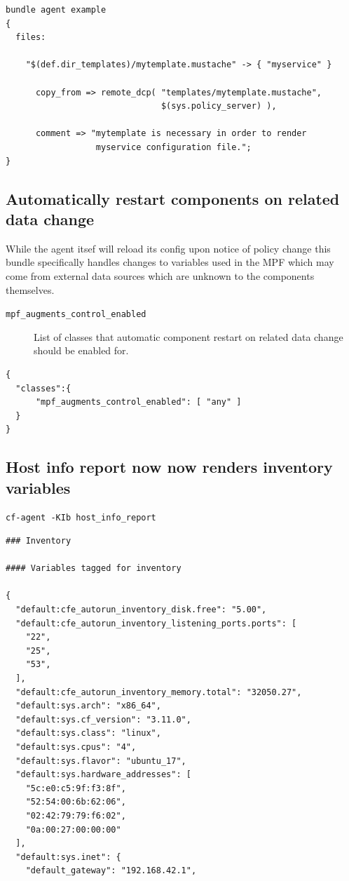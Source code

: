 \documentclass[11pt]{article}
\begin{document}
\begin{verbatim}
bundle agent example
{
  files:

    "$(def.dir_templates)/mytemplate.mustache" -> { "myservice" }

      copy_from => remote_dcp( "templates/mytemplate.mustache",
                               $(sys.policy_server) ),

      comment => "mytemplate is necessary in order to render
                  myservice configuration file.";
}
\end{verbatim}

\subsection*{Automatically restart components on related data change}
\label{sec:org56b9bf1}

\begin{NOTES}
While the agent itsef will reload its config upon notice of policy change this
bundle specifically handles changes to variables used in the MPF which may come
from external data sources which are unknown to the components themselves.
\end{NOTES}

\begin{description}
\item[{\texttt{mpf\_augments\_control\_enabled}}] List of classes that automatic component
restart on related data change should be enabled for.
\end{description}

\begin{verbatim}
{
  "classes":{
      "mpf_augments_control_enabled": [ "any" ]
  }
}
\end{verbatim}

\subsection*{Host info report now now renders inventory variables}
\label{sec:org011b701}

\begin{verbatim}
cf-agent -KIb host_info_report
\end{verbatim}

\begin{verbatim}
### Inventory

#### Variables tagged for inventory

{
  "default:cfe_autorun_inventory_disk.free": "5.00",
  "default:cfe_autorun_inventory_listening_ports.ports": [
    "22",
    "25",
    "53",
  ],
  "default:cfe_autorun_inventory_memory.total": "32050.27",
  "default:sys.arch": "x86_64",
  "default:sys.cf_version": "3.11.0",
  "default:sys.class": "linux",
  "default:sys.cpus": "4",
  "default:sys.flavor": "ubuntu_17",
  "default:sys.hardware_addresses": [
    "5c:e0:c5:9f:f3:8f",
    "52:54:00:6b:62:06",
    "02:42:79:79:f6:02",
    "0a:00:27:00:00:00"
  ],
  "default:sys.inet": {
    "default_gateway": "192.168.42.1",
\end{verbatim}
\end{document}
